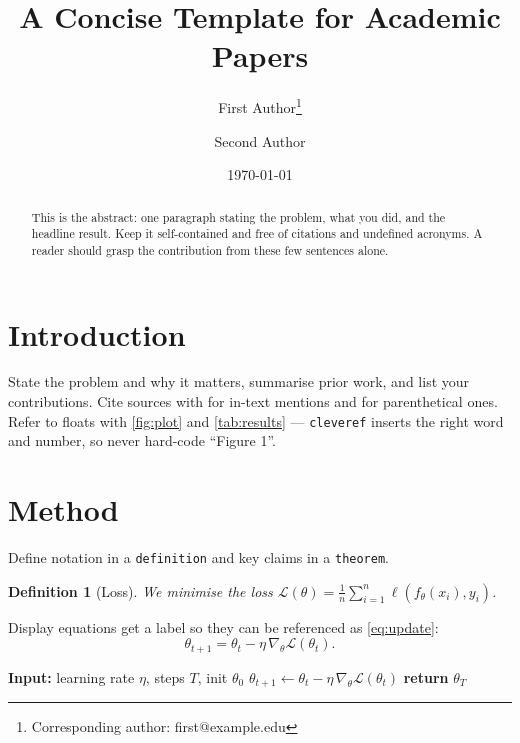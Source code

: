 \documentclass[11pt,a4paper]{article}
\title{\bfseries A Concise Template for Academic Papers}
\author{First Author\thanks{Corresponding author: first@example.edu} \and Second Author}
\date{\today}
\newtheorem{definition}{Definition}
\begin{document}
\maketitle

\begin{abstract}
\noindent
This is the abstract: one paragraph stating the problem, what you did, and the
headline result. Keep it self-contained and free of citations and undefined
acronyms. A reader should grasp the contribution from these few sentences alone.
\end{abstract}

\section{Introduction}
\label{sec:intro}

State the problem and why it matters, summarise prior work, and list your
contributions. Cite sources with \citet{einstein1905} for in-text mentions and
\citep{knuth1984} for parenthetical ones. Refer to floats with \cref{fig:plot}
and \cref{tab:results} — \texttt{cleveref} inserts the right word and number,
so never hard-code ``Figure 1''.

\section{Method}
\label{sec:method}

Define notation in a \texttt{definition} and key claims in a \texttt{theorem}.

\begin{definition}[Loss]
We minimise the loss $\mathcal{L}(\theta)=\frac{1}{n}\sum_{i=1}^{n} \ell(f_\theta(x_i), y_i)$.
\end{definition}

Display equations get a label so they can be referenced as \cref{eq:update}:
\begin{equation}
  \theta_{t+1} = \theta_t - \eta \, \nabla_\theta \mathcal{L}(\theta_t).
  \label{eq:update}
\end{equation}

\begin{algorithm}[ht]
\caption{Gradient descent}
\label{alg:gd}
\begin{algorithmic}[1]
  \State \textbf{Input:} learning rate $\eta$, steps $T$, init $\theta_0$
    \State $\theta_{t+1} \gets \theta_t - \eta\,\nabla_\theta \mathcal{L}(\theta_t)$
  \EndFor
  \State \textbf{return} $\theta_T$
\end{algorithmic}
\end{algorithm}
\end{document}
